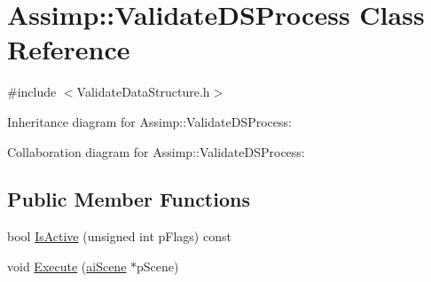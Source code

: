 \hypertarget{class_assimp_1_1_validate_d_s_process}{\section{Assimp\+:\+:Validate\+D\+S\+Process Class Reference}
\label{class_assimp_1_1_validate_d_s_process}
}


{\ttfamily \#include $<$Validate\+Data\+Structure.\+h$>$}



Inheritance diagram for Assimp\+:\+:Validate\+D\+S\+Process\+:


Collaboration diagram for Assimp\+:\+:Validate\+D\+S\+Process\+:
\subsection*{Public Member Functions}
\begin{DoxyCompactItemize}
\item 
bool \hyperlink{class_assimp_1_1_validate_d_s_process_aedaa4dc34da51a813f45c18cb496fa6f}{Is\+Active} (unsigned int p\+Flags) const 
\item 
void \hyperlink{class_assimp_1_1_validate_d_s_process_a6a394d0c9953d3dec71257da615fa0c6}{Execute} (\hyperlink{structai_scene}{ai\+Scene} $\ast$p\+Scene)
\end{DoxyCompactItemize}
